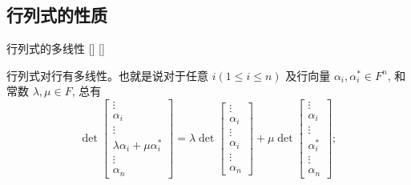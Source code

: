 \documentclass[UTF8]{ctexart}
\begin{document}
	\subsection{行列式的性质}
        \begin{thm}
			[]
			{行列式的多线性}
			[]
			[]

        行列式对行有多线性。也就是说对于任意 $i (1 \leq i \leq n)$ 及行向量 $\alpha_i, \alpha_i^* \in F^n$, 和常数 $\lambda, \mu \in F$, 总有 
        \[
        \det \left[ \begin{array}{c}
        \vdots \\
        \alpha_{i} \\
        \vdots \\
        \lambda \alpha_i + \mu \alpha_i^* \\
        \vdots \\
        \alpha_n
        \end{array} \right]
        =
        \lambda \det \left[ \begin{array}{c}
        \vdots \\
        \alpha_{i} \\
        \vdots \\
        \alpha_i \\
        \vdots \\
        \alpha_n
        \end{array} \right]
        + \mu \det \left[ \begin{array}{c}
        \vdots \\
        \alpha_{i} \\
        \vdots \\
        \alpha_i^* \\
        \vdots \\
        \alpha_n
        \end{array} \right];
        \]
        \end{thm}
\end{document}
